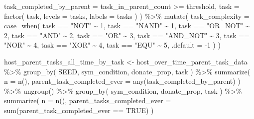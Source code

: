 \documentclass[
]{book}
\newenvironment{Shaded}{\begin{snugshade}}{\end{snugshade}}
\newcommand{\AttributeTok}[1]{\textcolor[rgb]{0.77,0.63,0.00}{#1}}
\newcommand{\ConstantTok}[1]{\textcolor[rgb]{0.00,0.00,0.00}{#1}}
\newcommand{\DecValTok}[1]{\textcolor[rgb]{0.00,0.00,0.81}{#1}}
\newcommand{\FunctionTok}[1]{\textcolor[rgb]{0.00,0.00,0.00}{#1}}
\newcommand{\NormalTok}[1]{#1}
\newcommand{\OtherTok}[1]{\textcolor[rgb]{0.56,0.35,0.01}{#1}}
\newcommand{\SpecialCharTok}[1]{\textcolor[rgb]{0.00,0.00,0.00}{#1}}
\newcommand{\StringTok}[1]{\textcolor[rgb]{0.31,0.60,0.02}{#1}}
\begin{document}
\begin{Shaded}
\begin{Highlighting}[]
    \AttributeTok{task\_completed\_by\_parent =}\NormalTok{ task\_in\_parent\_count }\SpecialCharTok{\textgreater{}=}\NormalTok{ threshold,}
    \AttributeTok{task =} \FunctionTok{factor}\NormalTok{(}
\NormalTok{      task,}
      \AttributeTok{levels =}\NormalTok{ tasks,}
      \AttributeTok{labels =}\NormalTok{ tasks}
\NormalTok{    )}
\NormalTok{  ) }\SpecialCharTok{\%\textgreater{}\%}
  \FunctionTok{mutate}\NormalTok{(}
    \AttributeTok{task\_complexity =} \FunctionTok{case\_when}\NormalTok{(}
\NormalTok{      task }\SpecialCharTok{==} \StringTok{"NOT"} \SpecialCharTok{\textasciitilde{}} \DecValTok{1}\NormalTok{,}
\NormalTok{      task }\SpecialCharTok{==} \StringTok{"NAND"} \SpecialCharTok{\textasciitilde{}} \DecValTok{1}\NormalTok{,}
\NormalTok{      task }\SpecialCharTok{==} \StringTok{"OR\_NOT"} \SpecialCharTok{\textasciitilde{}} \DecValTok{2}\NormalTok{,}
\NormalTok{      task }\SpecialCharTok{==} \StringTok{"AND"} \SpecialCharTok{\textasciitilde{}} \DecValTok{2}\NormalTok{,}
\NormalTok{      task }\SpecialCharTok{==} \StringTok{"OR"} \SpecialCharTok{\textasciitilde{}} \DecValTok{3}\NormalTok{,}
\NormalTok{      task }\SpecialCharTok{==} \StringTok{"AND\_NOT"} \SpecialCharTok{\textasciitilde{}} \DecValTok{3}\NormalTok{,}
\NormalTok{      task }\SpecialCharTok{==} \StringTok{"NOR"} \SpecialCharTok{\textasciitilde{}} \DecValTok{4}\NormalTok{,}
\NormalTok{      task }\SpecialCharTok{==} \StringTok{"XOR"} \SpecialCharTok{\textasciitilde{}} \DecValTok{4}\NormalTok{,}
\NormalTok{      task }\SpecialCharTok{==} \StringTok{"EQU"} \SpecialCharTok{\textasciitilde{}} \DecValTok{5}\NormalTok{,}
      \AttributeTok{.default =} \SpecialCharTok{{-}}\DecValTok{1}
\NormalTok{    )}
\NormalTok{  )}

\NormalTok{host\_parent\_tasks\_all\_time\_by\_task }\OtherTok{\textless{}{-}}\NormalTok{ host\_over\_time\_parent\_task\_data }\SpecialCharTok{\%\textgreater{}\%}
  \FunctionTok{group\_by}\NormalTok{(}
\NormalTok{    SEED,}
\NormalTok{    sym\_condition,}
\NormalTok{    donate\_prop,}
\NormalTok{    task}
\NormalTok{  ) }\SpecialCharTok{\%\textgreater{}\%}
  \FunctionTok{summarize}\NormalTok{(}
    \AttributeTok{n =} \FunctionTok{n}\NormalTok{(),}
    \AttributeTok{parent\_task\_completed\_ever =} \FunctionTok{any}\NormalTok{(task\_completed\_by\_parent)}
\NormalTok{  ) }\SpecialCharTok{\%\textgreater{}\%}
  \FunctionTok{ungroup}\NormalTok{() }\SpecialCharTok{\%\textgreater{}\%}
  \FunctionTok{group\_by}\NormalTok{(}
\NormalTok{    sym\_condition,}
\NormalTok{    donate\_prop,}
\NormalTok{    task}
\NormalTok{  ) }\SpecialCharTok{\%\textgreater{}\%}
  \FunctionTok{summarize}\NormalTok{(}
    \AttributeTok{n =} \FunctionTok{n}\NormalTok{(),}
    \AttributeTok{parent\_tasks\_completed\_ever =} \FunctionTok{sum}\NormalTok{(parent\_task\_completed\_ever }\SpecialCharTok{==} \ConstantTok{TRUE}\NormalTok{)}
\NormalTok{  )}
\end{Highlighting}
\end{Shaded}
\end{document}
